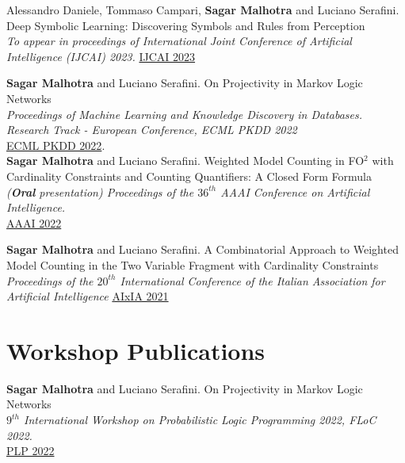 \documentclass[10pt, a4paper]{article}
\newcommand{\years}[1]{\marginnote{\scriptsize #1}}
\begin{document}
\years{2023} Alessandro Daniele, Tommaso Campari, \textbf{Sagar Malhotra} and Luciano Serafini. \\ Deep Symbolic Learning: Discovering Symbols and Rules from Perception \\ \emph{To appear in proceedings of International Joint Conference of Artificial Intelligence (IJCAI) 2023.} \href{https://arxiv.org/abs/2208.11561}{IJCAI 2023}

\years{2022}\textbf{Sagar Malhotra} and Luciano Serafini. On Projectivity in Markov Logic Networks \\ \emph{Proceedings of Machine Learning and Knowledge Discovery in Databases. Research Track - European Conference, ECML PKDD 2022} \\  
\href{https://link.springer.com/chapter/10.1007/978-3-031-26419-1_14}{ECML PKDD 2022}.\\
\years{2022}\textbf{Sagar Malhotra} and Luciano Serafini. Weighted Model Counting in FO$^2$ with Cardinality Constraints and Counting Quantifiers: A Closed Form Formula \\ \emph{(\textbf{Oral} presentation) Proceedings of the $36^{th}$ AAAI Conference on Artificial Intelligence.}\\
\href{https://ojs.aaai.org/index.php/AAAI/article/view/20525}{AAAI 2022}  

\years{2021}\textbf{Sagar Malhotra} and Luciano Serafini. A Combinatorial Approach to Weighted Model Counting in the Two Variable Fragment with Cardinality Constraints\\ \emph{ Proceedings of the $20^{th}$ International Conference of the Italian Association for Artificial Intelligence}
\href{https://link.springer.com/chapter/10.1007/978-3-031-08421-8_10}{AIxIA 2021} 


\section*{Workshop Publications}
\noindent
\years{2022}\textbf{Sagar Malhotra} and Luciano Serafini. On Projectivity in Markov Logic Networks\\ 
\emph{$9^{th}$ International Workshop on Probabilistic Logic Programming 2022, FLoC 2022.}\\
\href{https://easychair.org/publications/preprint/2lTk}{ PLP 2022}
\end{document}
